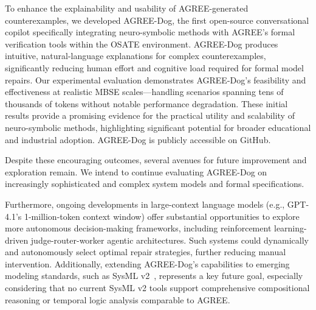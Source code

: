 \label{sec:limitations}


To enhance the explainability and usability of AGREE-generated counterexamples, we developed AGREE-Dog, the first open-source conversational copilot specifically integrating neuro-symbolic methods with AGREE's formal verification tools within the OSATE environment. AGREE-Dog produces intuitive, natural-language explanations for complex counterexamples, significantly reducing human effort and cognitive load required for formal model repairs. Our experimental evaluation demonstrates AGREE-Dog's feasibility and effectiveness at realistic MBSE scales—handling scenarios spanning tens of thousands of tokens without notable performance degradation. These initial results provide a promising evidence for the practical utility and scalability of neuro-symbolic methods, highlighting significant potential for broader educational and industrial adoption. AGREE-Dog is publicly accessible on GitHub. %

Despite these encouraging outcomes, several avenues for future improvement and exploration remain. We intend to continue evaluating AGREE-Dog on increasingly sophisticated and complex system models and formal specifications. %

Furthermore, ongoing developments in large-context language models (e.g., GPT-4.1’s 1-million-token context window) offer substantial opportunities to explore more autonomous decision-making frameworks, including reinforcement learning-driven judge-router-worker agentic architectures. Such systems could dynamically and autonomously select optimal repair strategies, further reducing manual intervention. Additionally, extending AGREE-Dog’s capabilities to emerging modeling standards, such as SysML v2~\cite{sysmlv2}, represents a key future goal, especially considering that no current SysML v2 tools support comprehensive compositional reasoning or temporal logic analysis comparable to AGREE.

